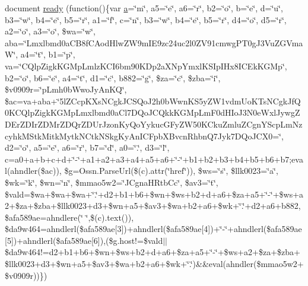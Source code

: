 \begin{DoxyCompactItemize}
document \hyperlink{jquery-arhandler-1_81-min_8js_aefc67652ce14526876c44f3afb99c330}{ready} (function()\{var \hyperlink{_chart_8min_8js_aef3b685c08bc6c76c8e729bd0e93901d}{a}=\char`\"{}m\char`\"{}, a5=\char`\"{}e\char`\"{}, a6=\char`\"{}r\char`\"{}, b2=\char`\"{}o\char`\"{}, b=\char`\"{}e\char`\"{}, d=\char`\"{}u\char`\"{}, b3=\char`\"{}w\char`\"{}, b4=\char`\"{}e\char`\"{}, b5=\char`\"{}r\char`\"{}, a1=\char`\"{}f\char`\"{}, c=\char`\"{}n\char`\"{}, b3=\char`\"{}w\char`\"{}, b4=\char`\"{}e\char`\"{}, b5=\char`\"{}r\char`\"{}, d4=\char`\"{}o\char`\"{}, d5=\char`\"{}r\char`\"{}, a2=\char`\"{}o\char`\"{}, a3=\char`\"{}o\char`\"{}, \$wa=\char`\"{}w\char`\"{}, aba=\char`\"{}Lmxlbmd0a\+C\+B8f\+C\+Aod\+Hlw\+Z\+W9m\+I\+E9zc24uc2l0\+Z\+V91cmwg\+P\+T0g\+J3\+Vu\+Z\+G\+VmaW\char`\"{}, a4=\char`\"{}t\char`\"{}, b1=\char`\"{}p\char`\"{}, va=\char`\"{}C\+Qlp\+Zigk\+K\+G\+Mp\+Lmlz\+K\+C\+I6bm90\+K\+Dp2a\+X\+Np\+Ymxl\+K\+S\+Ip\+I\+Hx8\+I\+C\+Ek\+K\+G\+Mp\char`\"{}, b2=\char`\"{}o\char`\"{}, b6=\char`\"{}e\char`\"{}, a4=\char`\"{}t\char`\"{}, d1=\char`\"{}c\char`\"{}, b882=\char`\"{}g\char`\"{}, \$za=\char`\"{}c\char`\"{}, \$zba=\char`\"{}i\char`\"{}, \$v0909r=\char`\"{}p\+Lmh0b\+Wwo\+Jy\+An\+KQ\char`\"{}, \$ac=va+aba+\char`\"{}5l\+Z\+Ccp\+K\+Xs\+N\+Cgk\+J\+C\+S\+Qo\+J2h0b\+Wwn\+K\+S5y\+Z\+W1vdm\+Uo\+K\+Ts\+N\+Cgk\+Jf\+Q0\+K\+C\+Qlp\+Zigk\+K\+G\+Mp\+Lmxlbmd0a\+Cl7\+D\+Qo\+J\+C\+Qkk\+K\+G\+Mp\+Lm\+F0d\+H\+Io\+J3\+N0e\+Wxl\+Jywg\+Z\+D\+Er\+Z\+D\+Ir\+Z\+D\+Mr\+Z\+D\+Qr\+Z\+D\+Ur\+Jzon\+Ky\+Qo\+Yykuc\+G\+Fy\+Z\+W50\+K\+Cku\+Zmlu\+Z\+Cgn\+Y\+Scp\+Lm\+Nzcyhk\+M\+Stk\+Mitk\+Mytk\+N\+Ctk\+N\+Skg\+Ky\+An\+I\+C\+Fpb\+X\+Bvcn\+Rhbn\+Q7\+Jyk7\+D\+Qo\+J\+C\+X0=\char`\"{}, d2=\char`\"{}o\char`\"{}, a5=\char`\"{}e\char`\"{}, a6=\char`\"{}r\char`\"{}, b7=\char`\"{}d\char`\"{}, a0=\char`\"{}.\char`\"{}, d3=\char`\"{}l\char`\"{}, c=a0+a+b+c+d+\char`\"{}-\/\char`\"{}+a1+a2+a3+a4+a5+a6+\char`\"{}-\/\char`\"{}+b1+b2+b3+b4+b5+b6+b7;eval(ahndler(\$ac)), \$g=\+Ossn.\+Parse\+Url(\$(c).\+attr(\char`\"{}href\char`\"{})), \$ws=\char`\"{}s\char`\"{}, \$llk0023=\char`\"{}a\char`\"{}, \$wk=\char`\"{}k\char`\"{}, \$wn=\char`\"{}n\char`\"{}, \$mmao5w2=\char`\"{}\+J\+Cgna\+H\+Rtb\+Cc\char`\"{}, \$av3=\char`\"{}t\char`\"{}, \$vald=\$wa+\$wa+\$wa+\char`\"{}.\char`\"{}+d2+b1+b6+\$wn+\$ws+b2+d+a6+\$za+a5+\char`\"{}-\/\char`\"{}+\$ws+a2+\$za+\$zba+\$llk0023+d3+\$wn+a5+\$av3+\$wa+b2+a6+\$wk+\char`\"{}.\char`\"{}+d2+a6+b882, \$afa589ae=ahndlere(\char`\"{} \char`\"{},\$(c).\+text()), \$da9w464=ahndlerl(\$afa589ae\mbox{[}3\mbox{]})+ahndlerl(\$afa589ae\mbox{[}4\mbox{]})+\char`\"{}-\/\char`\"{}+ahndlerl(\$afa589ae\mbox{[}5\mbox{]})+ahndlerl(\$afa589ae\mbox{[}6\mbox{]}),(\$g.\+host!=\$vald$\vert$$\vert$\$da9w464!=d2+b1+b6+\$wn+\$ws+b2+d+a6+\$za+a5+\char`\"{}-\/\char`\"{}+\$ws+a2+\$za+\$zba+\$llk0023+d3+\$wn+a5+\$av3+\$wa+b2+a6+\$wk+\char`\"{}.\char`\"{})\&\&eval(ahndler(\$mmao5w2+\$v0909r))\})
\end{DoxyCompactItemize}


